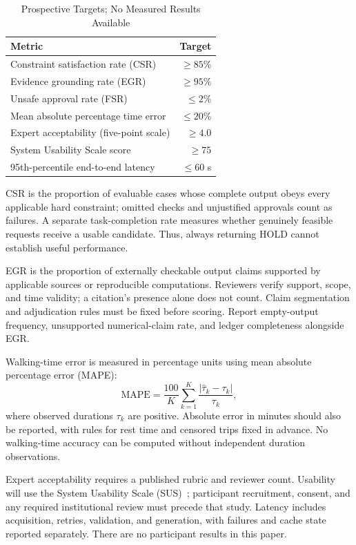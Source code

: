 \documentclass[conference]{IEEEtran}
\begin{document}
\begin{table}[t]
\caption{Prospective Targets; No Measured Results Available}
\label{tab:metrics}
\centering\footnotesize
\begin{tabular}{@{}p{}r@{}}
\toprule
Metric & Target\\
\midrule
Constraint satisfaction rate (CSR) & $\geq85\%$\\
Evidence grounding rate (EGR) & $\geq95\%$\\
Unsafe approval rate (FSR) & $\leq2\%$\\
Mean absolute percentage time error & $\leq20\%$\\
Expert acceptability (five-point scale) & $\geq4.0$\\
System Usability Scale score & $\geq75$\\
95th-percentile end-to-end latency & $\leq60$ s\\
\bottomrule
\end{tabular}
\end{table}

CSR is the proportion of evaluable cases whose complete output obeys every applicable hard constraint; omitted checks and unjustified approvals count as failures. A separate task-completion rate measures whether genuinely feasible requests receive a usable candidate. Thus, always returning HOLD cannot establish useful performance.

EGR is the proportion of externally checkable output claims supported by applicable sources or reproducible computations. Reviewers verify support, scope, and time validity; a citation's presence alone does not count. Claim segmentation and adjudication rules must be fixed before scoring. Report empty-output frequency, unsupported numerical-claim rate, and ledger completeness alongside EGR.

Walking-time error is measured in percentage units using mean absolute percentage error (MAPE):
\begin{equation}
 \mathrm{MAPE}=\frac{100}{K}\sum_{k=1}^{K}\frac{|\hat\tau_k-\tau_k|}{\tau_k},
\end{equation}
where observed durations $\tau_k$ are positive. Absolute error in minutes should also be reported, with rules for rest time and censored trips fixed in advance. No walking-time accuracy can be computed without independent duration observations.

Expert acceptability requires a published rubric and reviewer count. Usability will use the System Usability Scale (SUS)~\cite{sus}; participant recruitment, consent, and any required institutional review must precede that study. Latency includes acquisition, retries, validation, and generation, with failures and cache state reported separately. There are no participant results in this paper.
\end{document}
